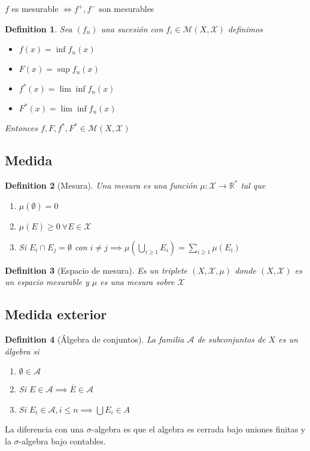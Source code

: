 \documentclass[leqno]{article}
\newtheorem*{definition}{Definition}
\begin{document}
$f$ es mesurable  $\iff f^+, f^-$ son mesurables

\begin{definition}
  Sea $(f_n)$ una sucesión con  $f_i\in \mathcal{M}(X, \mathcal{X})$ definimos
  \begin{itemize}[topsep=-6pt, itemsep=0pt]
    \item $f(x) =  \inf f_n(x)$
    \item $F(x) =  \sup f_n(x)$
    \item $f^*(x) =  \lim \inf f_n(x)$
    \item $F^*(x) =  \lim \inf f_n(x)$
  \end{itemize}
  Entonces $f, F, f^*, F^* \in \mathcal{M}(X, \mathcal{X})$
\end{definition}

\subsection{Medida}
\begin{definition}[Mesura] Una mesura es una función $\mu : \mathcal{X}\to \mathbb{R}^*$ tal que
  \begin{enumerate}[topsep=-6pt, itemsep=0pt]
    \item $\mu(\emptyset) = 0$
	\item  $\mu(E)\ge 0 \ \forall E \in \mathcal{X}$ 
	\item Si $E_i \cap E_j = \emptyset$ con $i\neq j \implies \displaystyle \mu\left( \bigcup_{i\ge 1} E_i \right) = \sum_{i\ge 1}\mu(E_{i})  $
  \end{enumerate}
\end{definition}

\begin{definition}[Espacio de mesura] Es un triplete $(X, \mathcal{X}, \mu)$ donde $(X, \mathcal{X})$ es un espacio mesurable y $\mu$ es una mesura sobre $\mathcal{X}$
\end{definition}

\subsection{Medida exterior}
\begin{definition}[Álgebra de conjuntos]
La familia $\mathcal{A}$ de subconjuntos de $X$ es un álgebra si
\begin{enumerate}[topsep=-6pt, itemsep=0pt]
  \item $\emptyset \in \mathcal{A}$ 
  \item Si $E\in \mathcal{A}\implies \overline{E} \in \mathcal{A}$ 
  \item Si $E_i \in \mathcal{A}, i\le n\implies \bigcup E_i \in A$
\end{enumerate}
\end{definition}
La diferencia con una $\sigma $-algebra es que el algebra es cerrada bajo uniones finitas y la $\sigma$-algebra bajo contables.
\end{document}
